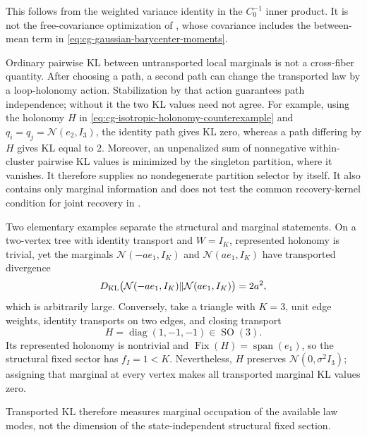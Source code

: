 This follows from the weighted variance identity in the \(C_0^{-1}\) inner
product. It is not the free-covariance optimization of
, whose covariance includes the
between-mean term in \eqref{eq:cg-gaussian-barycenter-moments}.

Ordinary pairwise KL between untransported local marginals is not a
cross-fiber quantity. After choosing a path, a second path can change the
transported law by a loop-holonomy action. Stabilization by that action
guarantees path independence; without it the two KL values need not agree.
For example, using the holonomy \(H\) in
\eqref{eq:cg-isotropic-holonomy-counterexample} and
\(q_i=q_j=\mathcal N(e_2,I_3)\), the identity path gives KL zero, whereas a
path differing by \(H\) gives KL equal to \(2\). Moreover, an unpenalized sum
of nonnegative within-cluster pairwise KL values is minimized by the
singleton partition, where it vanishes. It therefore supplies no
nondegenerate partition selector by itself. It also contains only marginal
information and does not test the common recovery-kernel condition for joint
recovery in . 

Two elementary examples separate the structural and marginal statements.
On a two-vertex tree with identity transport and \(W=I_K\), represented
holonomy is trivial, yet the marginals
\(\mathcal N(-ae_1,I_K)\) and \(\mathcal N(ae_1,I_K)\) have transported
divergence
\begin{equation}
D_{\mathrm{KL}}\bigl(\mathcal N(-ae_1,I_K)\Vert
\mathcal N(ae_1,I_K)\bigr)=2a^2,
\label{eq:cg-trivial-holonomy-large-kl}
\end{equation}
which is arbitrarily large. Conversely, take a triangle with \(K=3\), unit
edge weights, identity transports on two edges, and closing transport
\begin{equation}
H=\operatorname{diag}(1,-1,-1)\in\operatorname{SO}(3).
\label{eq:cg-isotropic-holonomy-counterexample}
\end{equation}
Its represented holonomy is nontrivial and
\(\operatorname{Fix}(H)=\operatorname{span}(e_1)\), so the structural fixed
sector has \(f_I=1<K\). Nevertheless, \(H\) preserves
\(\mathcal N(0,\sigma^2I_3)\); assigning that marginal at every vertex makes
all transported marginal KL values zero. 

Transported KL therefore measures marginal occupation of the available law
modes, not the dimension of the state-independent structural fixed section.

